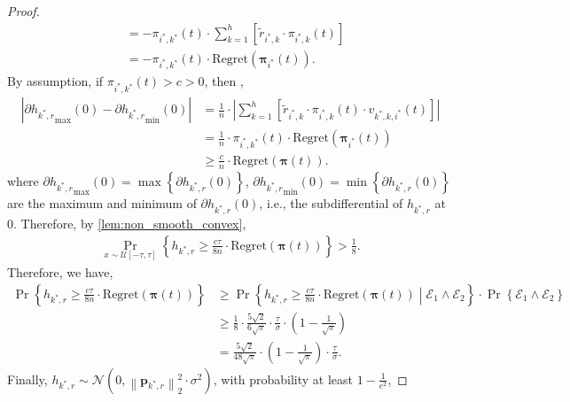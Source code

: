 \documentclass[10pt]{article}
\def\rvp{{\mathbf{p}}}
\def\regret{{\text{Regret}}}
\def\rvpi{{\boldsymbol{\pi}}}
\def\gN{{\mathcal{N}}}
\def\gE{{\mathcal{E}}}
\def\gU{{\mathcal{U}}}
\DeclareMathOperator*{\probability}{Pr}
\begin{document}
\begin{proof}
\begin{equation*}
\begin{split}
	&= - \pi_{i^*,k^*}(t) \cdot \sum\limits_{k=1}^{h}{ \left[ \tilde{r}_{i^*,k} \cdot \pi_{i^*,k}(t) \right] } \\
	&= - \pi_{i^*,k^*}(t) \cdot \regret(\rvpi_{i^*}(t)).
\end{split}
\end{equation*}
By assumption, if $\pi_{i^*,k^*}(t) > c > 0$, then ,
\begin{equation*}
\begin{split}
	\left| \partial{h_{k^*,r}}_{\max}{(0)} - \partial{h_{k^*,r}}_{\min}{(0)} \right| &= \frac{1}{n} \cdot \left| \sum\limits_{k=1}^{h}{ \left[ \tilde{r}_{i^*,k} \cdot \pi_{i^*,k}(t) \cdot v_{k^*,k,i^*}(t) \right] } \right| \\
	&= \frac{1}{n} \cdot \pi_{i^*,k^*}(t) \cdot \regret(\rvpi_{i^*}(t)) \\
	&\ge \frac{c}{n} \cdot \regret(\rvpi(t)).
\end{split}
\end{equation*}
where $\partial{h_{k^*,r}}_{\max}{(0)} = \max\left\{ \partial{h_{k^*,r}}{(0)} \right\}$, $\partial{h_{k^*,r}}_{\min}{(0)} = \min\left\{ \partial{h_{k^*,r}}{(0)} \right\}$ are the maximum and minimum of $\partial{h_{k^*,r}}{(0)}$, i.e., the subdifferential of $h_{k^*,r}$ at $0$. Therefore, by \cref{lem:non_smooth_convex},
\begin{equation*}
\begin{split}
	\probability\limits_{x \sim  \gU[-\tau, \tau]}\left\{ h_{k^*,r} \ge \frac{c\tau}{8n} \cdot \regret(\rvpi(t)) \right\} > \frac{1}{8}.
\end{split}
\end{equation*}
Therefore, we have,
\begin{equation}
\label{eq:h_regret_lower_bound}
\begin{split}
	\probability\left\{ h_{k^*,r} \ge \frac{c\tau}{8n} \cdot \regret(\rvpi(t)) \right\} &\ge \probability\left\{ h_{k^*,r} \ge \frac{c\tau}{8n} \cdot \regret(\rvpi(t)) \middle| \gE_1 \land \gE_2 \right\} \cdot \probability\left\{ \gE_1 \land \gE_2 \right\} \\
	&\ge \frac{1}{8} \cdot \frac{5\sqrt{2}}{6\sqrt{\pi}} \cdot \frac{\tau}{\sigma} \cdot \left( 1 - \frac{1}{\sqrt{\pi}} \right) \\
	&= \frac{5\sqrt{2}}{48\sqrt{\pi}} \cdot \left( 1 - \frac{1}{\sqrt{\pi}} \right) \cdot \frac{\tau}{\sigma}.
\end{split}
\end{equation}
Finally, $h_{k^*,r} \sim \gN\left( 0, \left\| \rvp_{k^*, r} \right\|_2^2 \cdot \sigma^2 \right)$, with probability at least $1 - \frac{1}{e^2}$,

\end{proof}
\end{document}
